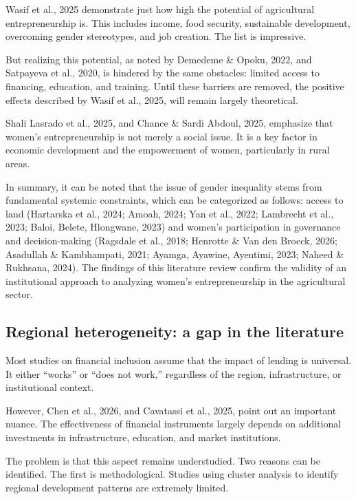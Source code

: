 ﻿\documentclass[sn-mathphys-num]{sn-jnl}
\newcommand{\hl}[1]{#1}
\begin{document}
\hl{Wasif et al., 2025} demonstrate just how high the potential of
agricultural entrepreneurship is. This includes income, food security,
sustainable development, overcoming gender stereotypes, and job
creation. The list is impressive.

But realizing this potential, as noted by \hl{Demedeme \& Opoku, 2022,}
and \hl{Satpayeva et al., 2020,} is hindered by the same obstacles:
limited access to financing, education, and training. Until these
barriers are removed, the positive effects described by \hl{Wasif et
al., 2025}, will remain largely theoretical.

\hl{Shali Lasrado et al., 2025}, and \hl{Chance \& Sardi Abdoul, 2025},
emphasize that women's entrepreneurship is not merely a social issue. It
is a key factor in economic development and the empowerment of women,
particularly in rural areas.

In summary, it can be noted that the issue of gender inequality stems
from fundamental systemic constraints, which can be categorized as
follows: access to land (\hl{Hartarska et al., 2024; Amoah, 2024};
\hl{Yan et al., 2022; Lambrecht et al., 2023; Baloi, Belete, Hlongwane,
2023}) and women's participation in governance and decision-making
(\hl{Ragsdale et al., 2018; Henrotte \& Van den Broeck, 2026};
\hl{Asadullah \& Kambhampati, 2021; Ayamga, Ayawine, Ayentimi, 2023;
Naheed \& Rukhsana, 2024)}. The findings of this literature review
confirm the validity of an institutional approach to analyzing women's
entrepreneurship in the agricultural sector.

\subsection{Regional heterogeneity: a gap in the literature}

Most studies on financial inclusion assume that the impact of lending is
universal. It either ``works'' or ``does not work,'' regardless of the
region, infrastructure, or institutional context.

However\hl{,} \hl{Chen et al., 2026,} and \hl{Cavatassi et al., 2025,}
point out an important nuance. The effectiveness of financial
instruments largely depends on additional investments in infrastructure,
education, and market institutions.

The problem is that this aspect remains understudied. Two reasons can be
identified. The first is methodological. Studies using cluster analysis
to identify regional development patterns are extremely limited.
\end{document}

